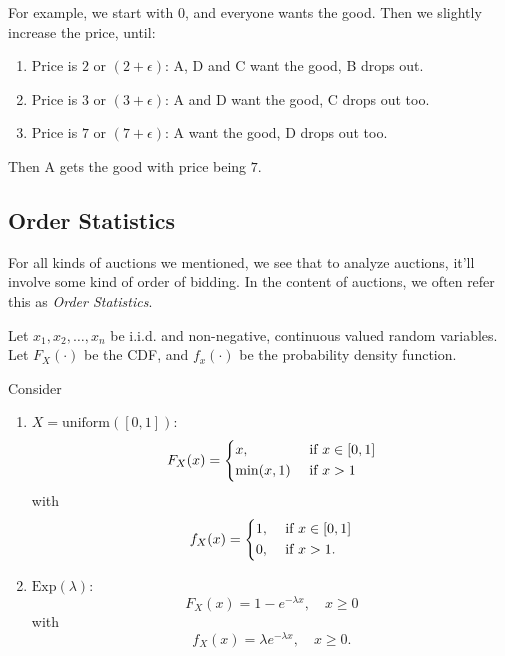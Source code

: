 \begin{eg}
\begin{enumerate}
			\begin{eg}
				For example, we start with \(0\), and everyone wants the good. Then we slightly increase the price, until:
				\begin{enumerate}
					\item Price is \(2\) or \((2+\epsilon)\):
					      A, D and C want the good, B drops out.
					\item Price is \(3\) or \((3+\epsilon)\):
					      A and D want the good, C drops out too.
					\item Price is \(7\) or \((7+\epsilon)\):
					      A want the good, D drops out too.
				\end{enumerate}
				Then A gets the good with price being \(7\).
			\end{eg}
	\end{enumerate}
\end{eg}

\subsection{Order Statistics}
For all kinds of auctions we mentioned, we see that to analyze auctions, it'll involve some kind of order of bidding. In the content of auctions, we often refer
this as \emph{Order Statistics}.

Let \(x_1, x_2, \ldots , x_n\) be i.i.d. and non-negative, continuous valued random variables. Let
\(F_{X}(\cdot)\) be the CDF, and \(f_{x}(\cdot)\) be the probability density function.
\begin{eg}
	Consider
	\begin{enumerate}
		\item \(X = \mathrm{uniform}([0, 1])\):
		      \[
			      F_X(x) = \begin{dcases}
				      x,         & \text{ if } x\in[0, 1] \\
				      \min(x, 1) & \text{ if }x>1         \\
			      \end{dcases}
		      \]
		      with
		      \[
			      f_X(x) = \begin{dcases}
				      1, & \text{ if } x\in[0, 1] \\
				      0, & \text{ if }x>1.
			      \end{dcases}
		      \]
		\item \(\mathrm{Exp}(\lambda)\):
		      \[
			      F_X(x) = 1 - e^{-\lambda x}, \quad x\geq 0
		      \]
		      with
		      \[
			      f_X(x) = \lambda e^{-\lambda x},\quad x\geq 0.
		      \]
	\end{enumerate}
\end{eg}


